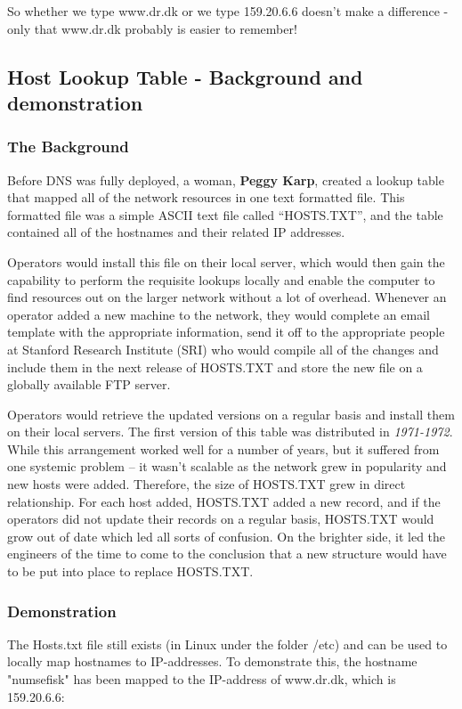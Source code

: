 So whether we type www.dr.dk or we type 159.20.6.6 doesn't make a difference - only that www.dr.dk probably is easier to remember! \\

\subsection{Host Lookup Table - Background and demonstration}

\subsubsection{The Background}
Before DNS was fully deployed, a woman, \textbf{Peggy Karp}, created a lookup table that mapped all of the network resources in one text formatted file. This formatted file was a simple ASCII text file called “HOSTS.TXT”, and the table contained all of the hostnames and their related IP addresses.

Operators would install this file on their local server, which would then gain the capability to perform the requisite lookups locally and enable the computer to find resources out on the larger network without a lot of overhead. Whenever an operator added a new machine to the network, they would complete an email template with the appropriate information, send it off to the appropriate people at Stanford Research Institute (SRI) who would compile all of the changes and include them in the next release of HOSTS.TXT and store the new file on a globally available FTP server.

Operators would retrieve the updated versions on a regular basis and install them on their local servers. The first version of this table was distributed in \textit{1971-1972}. While this arrangement worked well for a number of years, but it suffered from one systemic problem – it wasn’t scalable as the network grew in popularity and new hosts were added. Therefore, the size of HOSTS.TXT grew in direct relationship. For each host added, HOSTS.TXT added a new record, and if the operators did not update their records on a regular basis, HOSTS.TXT would grow out of date which led all sorts of confusion. On the brighter side, it led the engineers of the time to come to the conclusion that a new structure would have to be put into place to replace HOSTS.TXT.

\subsubsection{Demonstration}
The Hosts.txt file still exists (in Linux under the folder /etc) and can be used to locally map hostnames to IP-addresses. To demonstrate this, the hostname "numsefisk" has been mapped to the IP-address of www.dr.dk, which is 159.20.6.6:

